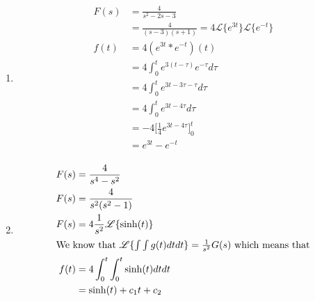 \documentclass[a4paper]{article}
\begin{document}
\begin{enumerate}[label=\alph*)]
    \item 
        \begin{align}
            F(s) &= \frac{4}{s^2-2s-3} \\
            &= \frac{4}{(s-3)(s+1)} = 4\mathscr{L}\{e^{3t}\}\mathscr{L}\{e^{-t}\} \\
            f(t) &= 4(e^{3t} * e^{-t})(t) \\
            &= 4\int_0^t{e^{3(t-\tau)}e^{-\tau}d\tau} \\
            &= 4\int_0^t{e^{3t-3\tau-\tau} d\tau} \\
            &= 4\int_0^t{e^{3t-4\tau} d\tau} \\
            &= -4\Big[\frac{1}{4}e^{3t-4\tau}\Big]_0^t\\
            &= e^{3t} - e^{-t}\\
        \end{align}

    \item
        \begin{align}
            F(s) &= \frac{4}{s^4-s^2} \\
            F(s) &= \frac{4}{s^2(s^2-1)} \\
            F(s) &= 4\frac{1}{s^2}\mathscr{L}\{\sinh(t)\} \\
            \intertext{We know that \(\mathscr{L}\{\int\int g(t)dtdt\} = \frac{1}{s^2}G(s)\) which means that}
            f(t) &= 4\int_0^t\int_0^t\sinh(t)dtdt \\
            &= \sinh(t) + c_1t + c_2\\
        \end{align}
\end{enumerate}


%
\end{document}
